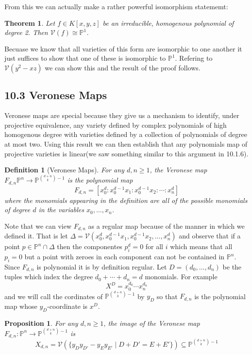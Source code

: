 \documentclass[40pt]{article}
\newtheorem{definition}{Definition}[section]
\newtheorem{theorem}{Theorem}[section]
\newcommand{\Proj}{\mathbb{P}}
\newcommand{\V}{\mathcal{V}}
\newtheorem{proposition}{Proposition}[section]
\theoremstyle{remark}
\begin{document}
		From this we can actually make a rather powerful isomorphism statememt:
		\begin{theorem}
			Let $f \in K[x,y,z]$ be an irreducible, homogenous polynomial of degree 2. Then $\V(f) \cong \Proj^1$.
		\end{theorem}
		Becuase we know that all varieties of this form are isomorphic to one another it just suffices to show that one of these is isomorphic to $\Proj^1$. Refering to $\V(y^2-xz)$ we can show this and the result of the proof follows.
		\subsection{10.3 Veronese Maps}
		Veronese maps are special because they give us a mechanism to identify, under projective equivalence, any variety defined by complex polynomials of high homogenous degree with varieties defined by a collection of polynomials of degree at most two. Using this result we can then establish that any polynomials map of projective varieties is linear(we saw something similar to this argument in 10.1.6). 
		\begin{definition}[Veronese Maps]
			For any $d,n \geq 1$, the Veronese map $F_{d,n} \Proj^n \rightarrow \Proj^{{d + n \choose k} - 1}$ is the polynomial map 
			\[
			F_{d,n} = [x_0^d: x_0^{d-1}x_1 : x_0^{d-1}x_2 : \cdots : x_n^d]
			\]
			where the monomials appearing in the definition are all of the possible monomials of degree $d$ in the variables $x_0,\dots,x_n$. 
		\end{definition}
		Note that we can view $F_{d,n}$ as a regular map because of the manner in which we defined it. That is let $\Delta = \V(x_0^d, x_0^{d-1}x_1,x_0^{d-1}x_2, \dots, x_n^d)$ and observe that if a point $p \in \Proj^n \cap \Delta$ then the componentes $p_i^d = 0$ for all $i$ which means that all $p_i = 0$ but a point with zeroes in each component can not be contained in $\Proj^n$. Since $F_{d,n}$ is polynomial it is by definition regular. Let $D = (d_0,\dots,d_n)$ be the tuples which index the degree $d_0 + \cdots +d_n = d$ monomials. For example 
		\[
		X^D = x_0^{d_0}\cdots x_n^{d_n}
		\]
		and we will call the cordinates of $\Proj^{{d + n \choose k} - 1}$ by $y_D$ so that $F_{d,n}$ is the polynomial map whose $y_D$-coordinate is $x^D$.  
		\begin{proposition}
			For any $d,n \geq 1$, the image of the Veronese map $F_{d,n}: \Proj^n \rightarrow \Proj^{{d + n \choose k} - 1}$ is 
				\[
				X_{d,n} = \V(\{y_Dy_{D'} - y_Ey_{E'} \; | \; D + D' = E + E'\}) \subseteq \Proj^{{d + n \choose k} - 1}
				\]
		\end{proposition}
\end{document}
